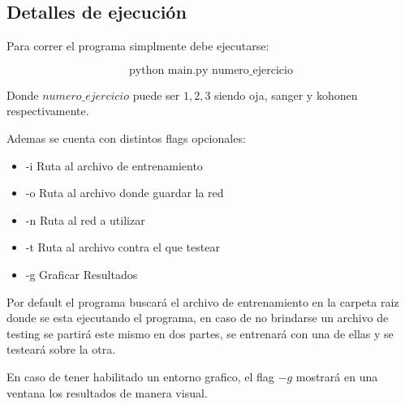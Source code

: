 \subsection{Detalles de ejecución}

Para correr el programa simplmente debe ejecutarse:

	$$\text{python main.py numero\_ejercicio}$$

Donde $numero\_ejercicio$ puede ser $1,2,3$ siendo oja, sanger y kohonen respectivamente.

Ademas se cuenta con distintos flags opcionales: 

\begin{itemize}
\item 	-i \quad Ruta al archivo de entrenamiento
\item 	-o \quad Ruta al archivo donde guardar la red
\item 	-n \quad Ruta al red a utilizar
\item 	-t \quad Ruta al archivo contra el que testear
\item 	-g \quad Graficar Resultados
\end{itemize}

Por default el programa buscará el archivo de entrenamiento en la carpeta raiz donde se esta ejecutando el programa, en caso de no brindarse un archivo de testing se partirá este mismo en dos partes, se entrenará con una de ellas y se testeará sobre la otra.

En caso de tener habilitado un entorno grafico, el flag $-g$ mostrará en una ventana los resultados de manera visual.
